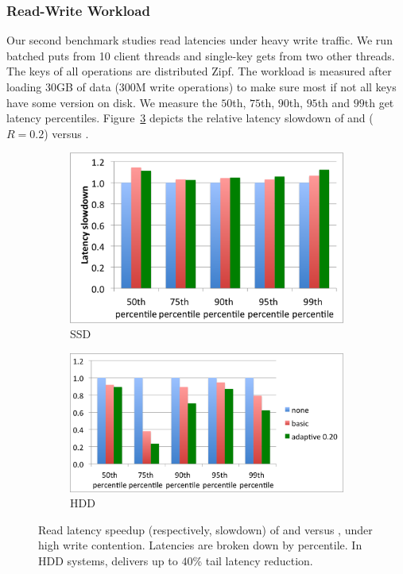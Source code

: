 \subsubsection{Read-Write Workload}

Our second benchmark studies read latencies under heavy write traffic. 
We run batched puts from 10 client threads and single-key gets from two other threads. 
The keys of all operations are distributed Zipf. The workload is measured after loading 30GB of data (300M write operations) to make sure most if not all keys have some version on disk. We measure the $50$th, 
$75$th, $90$th, $95$th and $99$th get latency percentiles. Figure~\ref{fig:latency} 
depicts the relative latency slowdown of \basic\/ and \adp\/ ($R=0.2$) versus \none.

\begin{figure}[t]
  \centering
  
  \begin{subfigure}[t]{.9\columnwidth}
      \includegraphics[width=\figw]{Figs/latency-ssd.png}
      \caption[]{SSD}
    \label{fig:latency:ssd}
  \end{subfigure}
  \begin{subfigure}[t]{1.1\columnwidth}
      \includegraphics[width=\figw]{Figs/latency-hdd.png}
      \caption[]{HDD}
    \label{fig:latency:hdd}
  \end{subfigure}

  \caption{Read latency speedup (respectively, slowdown) of \basic\/ and \adp\/ versus \none, under high write contention.
  Latencies are broken down by percentile. In HDD systems, \adp\/ delivers up to $40$\% tail latency reduction. 
  }
  
  \label{fig:latency}
\end{figure}

